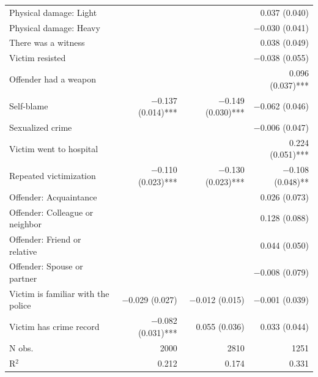 \begin{tabular}{lrrr}
	Physical damage: Light &  &  & \num{0.037} (\num{0.040}) \\
	Physical damage: Heavy &  &  & \num{-0.030} (\num{0.041}) \\
	There was a witness &  &  & \num{0.038} (\num{0.049}) \\
	Victim resisted &  &  & \num{-0.038} (\num{0.055}) \\
	Offender had a weapon &  &  & \num{0.096} (\num{0.037})*** \\
	Self-blame & \num{-0.137} (\num{0.014})*** & \num{-0.149} (\num{0.030})*** & \num{-0.062} (\num{0.046}) \\
	Sexualized crime &  &  & \num{-0.006} (\num{0.047}) \\
	Victim went to hospital &  &  & \num{0.224} (\num{0.051})*** \\
	Repeated victimization & \num{-0.110} (\num{0.023})*** & \num{-0.130} (\num{0.023})*** & \num{-0.108} (\num{0.048})** \\
	Offender:          Acquaintance &  &  & \num{0.026} (\num{0.073}) \\
	Offender: Colleague or neighbor &  &  & \num{0.128} (\num{0.088}) \\
	Offender:    Friend or relative &  &  & \num{0.044} (\num{0.050}) \\
	Offender:     Spouse or partner &  &  & \num{-0.008} (\num{0.079}) \\
	Victim is familiar with the police & \num{-0.029} (\num{0.027}) & \num{-0.012} (\num{0.015}) & \num{-0.001} (\num{0.039}) \\
	Victim has crime record & \num{-0.082} (\num{0.031})*** & \num{0.055} (\num{0.036}) & \num{0.033} (\num{0.044}) \\
	\midrule
	N obs. & \num{2000} & \num{2810} & \num{1251} \\
	R$^2$ & \num{0.212} & \num{0.174} & \num{0.331} \\
	\midrule
\end{tabular}
	\endgroup




